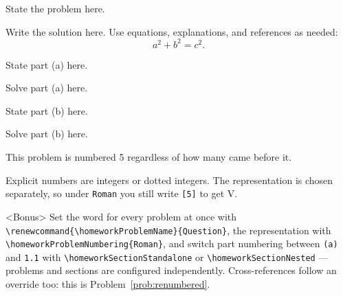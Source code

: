 \documentclass[oneside]{article}
\begin{document}
\makehomeworktitle

\begin{homeworkProblem}
State the problem here.

\begin{solution}
Write the solution here. Use equations, explanations, and references as needed:
\[
    a^2 + b^2 = c^2.
\]
\end{solution}
\end{homeworkProblem}

\begin{homeworkProblem}
\begin{homeworkSection}
State part (a) here.
\begin{solution}
Solve part (a) here.
\end{solution}
\end{homeworkSection}

\begin{homeworkSection}
State part (b) here.
\begin{solution}
Solve part (b) here.
\end{solution}
\end{homeworkSection}
\end{homeworkProblem}

\begin{homeworkProblem}\label{prob:renumbered}
This problem is numbered 5 regardless of how many came before it.
\end{homeworkProblem}

\begin{homeworkProblem}
Explicit numbers are integers or dotted integers. The representation is chosen
separately, so under \texttt{Roman} you still write \texttt{[5]} to get V.
\end{homeworkProblem}

\begin{homeworkProblem}<Bonus>
Set the word for every problem at once with
\texttt{\textbackslash renewcommand\{\textbackslash homeworkProblemName\}\{Question\}},
the representation with \texttt{\textbackslash homeworkProblemNumbering\{Roman\}}, and
switch part numbering between \texttt{(a)} and \texttt{1.1} with
\texttt{\textbackslash homeworkSectionStandalone} or
\texttt{\textbackslash homeworkSectionNested} --- problems and sections are configured
independently. Cross-references follow an override too: this is
Problem~\ref{prob:renumbered}.
\end{homeworkProblem}
\end{document}
